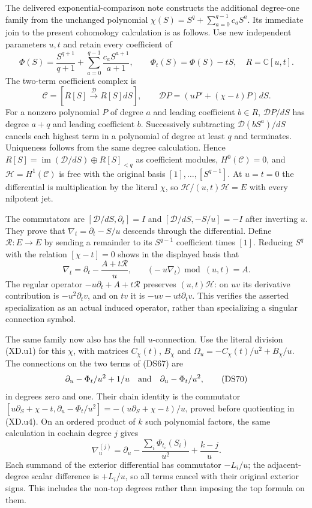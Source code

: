 The delivered exponential-comparison note constructs the additional
degree-one family from the unchanged polynomial
$\chi(S)=S^q+\sum_{a=0}^{q-1}c_aS^a$.  Its immediate join to the
present cohomology calculation is as follows.  Use new independent
parameters $u,t$ and retain every coefficient of
\[
 \Phi(S)=\frac{S^{q+1}}{q+1}
 +\sum_{a=0}^{q-1}\frac{c_aS^{a+1}}{a+1},\qquad
 \Phi_t(S)=\Phi(S)-tS,
 \quad R=\mathbb C[u,t].
 \tag{DS66}
\]
The two-term coefficient complex is
\[
 \mathcal C=[R[S]\xrightarrow{\mathcal D}R[S]dS],
 \qquad\mathcal D P=(uP'+(\chi-t)P)dS.
 \tag{DS67}
\]
For a nonzero polynomial $P$ of degree $a$ and leading coefficient
$b\in R$, $\mathcal DP/dS$ has degree $a+q$ and leading coefficient
$b$.  Successively subtracting $\mathcal D(bS^a)/dS$ cancels each
highest term in a polynomial of degree at least $q$ and terminates.
Uniqueness follows from the same degree calculation.  Hence
$R[S]=\operatorname{im}(\mathcal D/dS)\oplus R[S]_{<q}$ as
coefficient modules, $H^0(\mathcal C)=0$, and
$\mathcal H=H^1(\mathcal C)$ is free with the original basis
$[1],\ldots,[S^{q-1}]$.  At $u=t=0$ the differential is
multiplication by the literal $\chi$, so
$\mathcal H/(u,t)\mathcal H=E$ with every nilpotent jet.

The commutators are
$[\mathcal D/dS,\partial_t]=I$ and
$[\mathcal D/dS,-S/u]=-I$ after inverting $u$.  They prove that
$\nabla_t=\partial_t-S/u$ descends through the differential.
Define $\mathcal R:E\to E$ by sending a remainder to its
$S^{q-1}$ coefficient times $[1]$.  Reducing $S^q$ with the relation
$[\chi-t]=0$ shows in the displayed basis that
\[
 \nabla_t=\partial_t-\frac{A+t\mathcal R}{u},\qquad
 \bigl(-u\nabla_t\bigr)\bmod(u,t)=A.
 \tag{DS68}
\]
The regular operator $-u\partial_t+A+t\mathcal R$ preserves
$(u,t)\mathcal H$: on $uv$ its derivative contribution is
$-u^2\partial_tv$, and on $tv$ it is $-uv-ut\partial_tv$.
This verifies the asserted specialization as an actual induced
operator, rather than specializing a singular connection symbol.


The same family now also has the full $u$-connection.  Use the
literal division (XD.u1) for this $\chi$, with matrices $C_\chi(t)$,
$B_\chi$ and $\Omega_u=-C_\chi(t)/u^2+B_\chi/u$.
The connections on the two terms of (DS67) are
\[
 \partial_u-\Phi_t/u^2+1/u\quad\hbox{and}\quad
 \partial_u-\Phi_t/u^2,                              \tag{DS70}
\]
in degrees zero and one.  Their chain identity is the commutator
$[u\partial_S+\chi-t,\partial_u-\Phi_t/u^2]
=-(u\partial_S+\chi-t)/u$, proved before quotienting in (XD.u4).
On an ordered product of $k$ such polynomial factors, the same
calculation in cochain degree $j$ gives
\[
 \nabla_u^{(j)}=\partial_u-\frac{\sum_i\Phi_{t_i}(S_i)}{u^2}
                         +\frac{k-j}{u}.             \tag{DS71}
\]
Each summand of the exterior differential has commutator $-L_i/u$;
the adjacent-degree scalar difference is $+L_i/u$, so all terms
cancel with their original exterior signs.  This includes the
non-top degrees rather than imposing the top formula on them.

